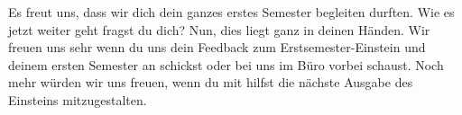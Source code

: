 Es freut uns, dass wir dich dein ganzes erstes Semester begleiten durften.
Wie es jetzt weiter geht fragst du dich?
Nun, dies liegt ganz in deinen Händen.
Wir freuen uns sehr wenn du uns dein Feedback zum Erstsemester-Einstein und deinem ersten Semester an  schickst oder bei uns im Büro vorbei schaust.
Noch mehr würden wir uns freuen, wenn du mit hilfst die nächste Ausgabe des Einsteins mitzugestalten.